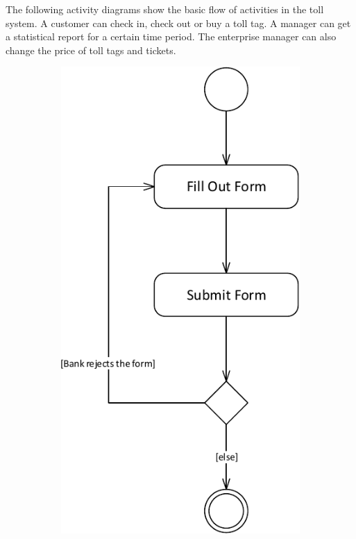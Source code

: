 The following activity diagrams show the basic flow of activities in the toll system. A customer can check in, check out or buy a toll tag. A manager can get a statistical report for a certain time period. The enterprise manager can also change the price of toll tags and tickets.

\begin{figure}[H]
	\centering
	\begin{subfigure}[b]{0.3\textwidth}
	\includegraphics[width=\textwidth]{img/activity_diagram/buy_toll_tag}

\end{subfigure}
\end{figure}
